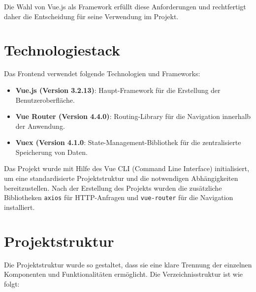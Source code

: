 Die Wahl von Vue.js als Framework erfüllt diese Anforderungen und rechtfertigt daher die Entscheidung für seine Verwendung im Projekt.


\section{Technologiestack}

Das Frontend verwendet folgende Technologien und Frameworks:

\begin{itemize}
	\item \textbf{Vue.js (Version 3.2.13)}: Haupt-Framework für die Erstellung der Benutzeroberfläche.
	\item \textbf{Vue Router (Version 4.4.0)}:  Routing-Library für die Navigation innerhalb der Anwendung.
	\item \textbf{Vuex (Version 4.1.0}: State-Management-Bibliothek für die zentralisierte Speicherung von Daten.
\end{itemize}

Das Projekt wurde mit Hilfe des Vue CLI (Command Line Interface) initialisiert, um eine standardisierte Projektstruktur und die notwendigen Abhängigkeiten bereitzustellen. Nach der Erstellung des Projekts wurden die zusätzliche Bibliotheken \texttt{axios} für HTTP-Anfragen und \texttt{vue-router} für die Navigation installiert.


\section{Projektstruktur}
Die Projektstruktur wurde so gestaltet, dass sie eine klare Trennung der einzelnen Komponenten und Funktionalitäten ermöglicht. Die Verzeichnisstruktur ist wie folgt:

